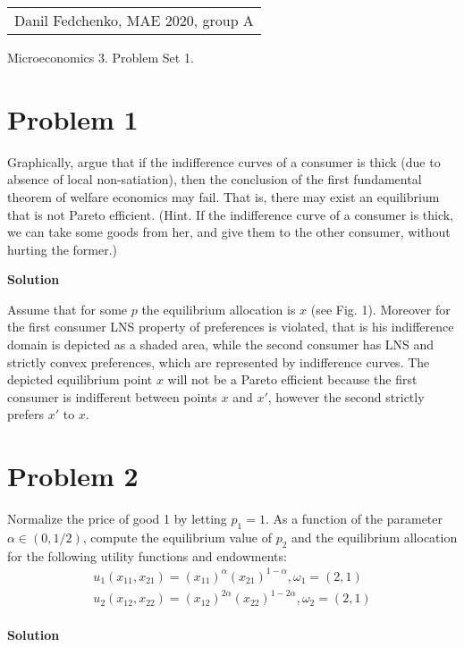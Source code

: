 \documentclass[a4paper]{article}
\begin{document}
	\begin{flushright}
	\begin{tabular}{r}
		Danil Fedchenko, MAE 2020, group A \\
	\end{tabular}
\end{flushright}


\begin{center}
	Microeconomics 3. Problem Set 1.
\end{center}
\section*{Problem 1}
Graphically, argue that if the indifference curves of a consumer is thick (due to absence of local non-satiation), then the conclusion of the first fundamental theorem of welfare economics may fail. That is, there may exist an equilibrium that is not Pareto efficient.
(Hint. If the indifference curve of a consumer is thick, we can take some goods from her,
and give them to the other consumer, without hurting the former.)


\textbf{Solution}


Assume that for some $p$ the equilibrium allocation is $x$ (see Fig. 1). Moreover for the first consumer LNS property of preferences is violated, that is his indifference domain is depicted as a shaded area, while the second consumer has LNS and strictly convex preferences, which are represented by indifference curves. The depicted equilibrium point $x$ will not be a Pareto efficient because the first consumer is indifferent between points $x$ and $x'$, however the second strictly prefers $x'$ to $x$.
\newpage
\section*{Problem 2}
Normalize the price of good 1 by letting $p_1 = 1$. As a function of the parameter $\alpha \in (0, 1/2)$, compute the equilibrium value of $p_2$ and the equilibrium allocation for the
following utility functions and endowments:
\begin{align*}
u_1(x_{11}, x_{21}) = (x_{11})^{\alpha}(x_{21})^{1-\alpha}, \omega_1 = (2, 1)\\
u_2(x_{12}, x_{22}) = (x_{12})^{2\alpha}(x_{22})^{1-2\alpha}, \omega_2 = (2, 1)\\
\end{align*}


\textbf{Solution}
\end{document}
